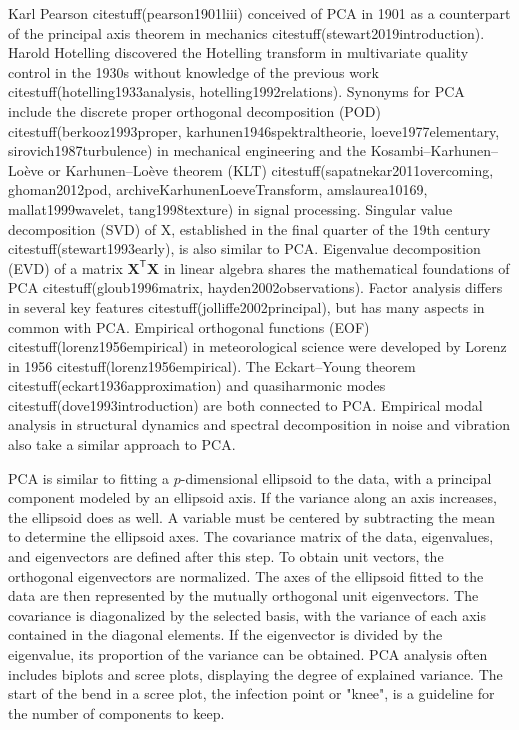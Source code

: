 \documentclass[preprint,12pt]{elsarticle}
\begin{document}
Karl Pearson citestuff(pearson1901liii) conceived of PCA in 1901 as a counterpart of the principal axis theorem in mechanics citestuff(stewart2019introduction). Harold Hotelling discovered the Hotelling transform in multivariate quality control in the 1930s without knowledge of the previous work citestuff(hotelling1933analysis, hotelling1992relations). Synonyms for PCA include the discrete proper orthogonal decomposition (POD) citestuff(berkooz1993proper, karhunen1946spektraltheorie, loeve1977elementary, sirovich1987turbulence) in mechanical engineering and the Kosambi–Karhunen–Loève or Karhunen–Loève theorem (KLT) citestuff(sapatnekar2011overcoming, ghoman2012pod, archiveKarhunenLoeveTransform, amslaurea10169, mallat1999wavelet, tang1998texture) in signal processing. Singular value decomposition (SVD) of X, established in the final quarter of the 19th century citestuff(stewart1993early), is also similar to PCA. Eigenvalue decomposition (EVD) of a matrix $\mathbf{X}^{\mathsf{T}}\mathbf{X}$ in linear algebra shares the mathematical foundations of PCA citestuff(gloub1996matrix, hayden2002observations). Factor analysis differs in several key features citestuff(jolliffe2002principal), but has many aspects in common with PCA. Empirical orthogonal functions (EOF) citestuff(lorenz1956empirical) in meteorological science were developed by Lorenz in 1956 citestuff(lorenz1956empirical). The Eckart–Young theorem citestuff(eckart1936approximation) and quasiharmonic modes citestuff(dove1993introduction) are both connected to PCA. Empirical modal analysis in structural dynamics and spectral decomposition in noise and vibration also take a similar approach to PCA.

PCA is similar to fitting a $p$-dimensional ellipsoid to the data, with a principal component modeled by an ellipsoid axis. If the variance along an axis increases, the ellipsoid does as well.
A variable must be centered by subtracting the mean to determine the ellipsoid axes. The covariance matrix of the data, eigenvalues, and eigenvectors are defined after this step. To obtain unit vectors, the orthogonal eigenvectors are normalized. The axes of the ellipsoid fitted to the data are then represented by the mutually orthogonal unit eigenvectors. The covariance is diagonalized by the selected basis, with the variance of each axis contained in the diagonal elements. If the eigenvector is divided by the eigenvalue, its proportion of the variance can be obtained.
PCA analysis often includes biplots and scree plots, displaying the degree of explained variance. The start of the bend in a scree plot, the infection point or "knee", is a guideline for the number of components to keep.
\end{document}
